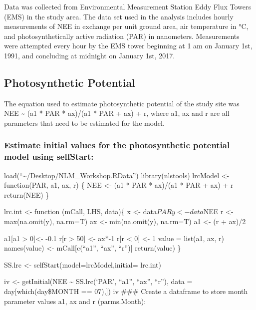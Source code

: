 \documentclass[
]{article}
\begin{document}
Data was collected from Environmental Measurement Station Eddy Flux
Towers (EMS) in the study area. The data set used in the analysis
includes hourly measurements of NEE in exchange per unit ground area,
air temperature in °C, and photosynthetically active radiation (PAR) in
nanometers. Measurements were attempted every hour by the EMS tower
beginning at 1 am on January 1st, 1991, and concluding at midnight on
January 1st, 2017.

\hypertarget{photosynthetic-potential}{%
\subsection{Photosynthetic Potential}\label{photosynthetic-potential}}

The equation used to estimate photosynthetic potential of the study site
was NEE \textasciitilde{} (a1 * PAR * ax)/(a1 * PAR + ax) + r, where a1,
ax and r are all parameters that need to be estimated for the model.

\hypertarget{estimate-initial-values-for-the-photosynthetic-potential-model-using-selfstart}{%
\subsubsection{Estimate initial values for the photosynthetic potential
model using
selfStart:}\label{estimate-initial-values-for-the-photosynthetic-potential-model-using-selfstart}}

load(``\textasciitilde/Desktop/NLM\_Workshop.RData'') library(nlstools)
lrcModel \textless- function(PAR, a1, ax, r) \{ NEE \textless- (a1 * PAR
* ax)/(a1 * PAR + ax) + r return(NEE) \}

lrc.int \textless- function (mCall, LHS, data)\{ x \textless-
data\(PAR y <- data\)NEE r \textless- max(na.omit(y), na.rm=T) ax
\textless- min(na.omit(y), na.rm=T) a1 \textless- (r + ax)/2

a1{[}a1 \textgreater{} 0{]}\textless- -0.1 r{[}r \textgreater{} 50{]}
\textless- ax*-1 r{[}r \textless{} 0{]} \textless- 1 value = list(a1,
ax, r) names(value) \textless- mCall{[}c(``a1'', ``ax'', ``r''){]}
return(value) \}

SS.lrc \textless- selfStart(model=lrcModel,initial= lrc.int)

iv \textless- getInitial(NEE \textasciitilde{} SS.lrc(`PAR', ``a1'',
``ax'', ``r''), data = day{[}which(day\$MONTH == 07),{]}) iv \#\#\#
Create a dataframe to store month parameter values a1, ax and r
(parms.Month):
\end{document}
